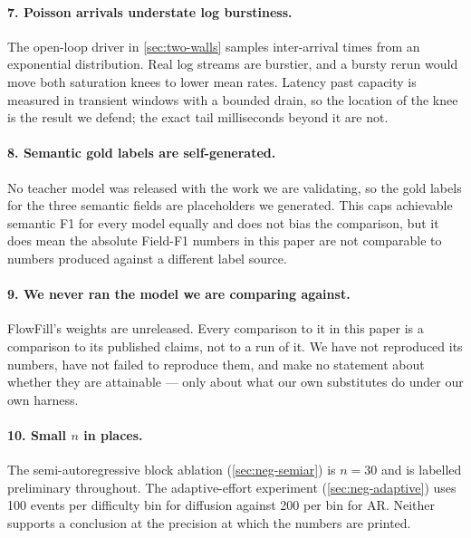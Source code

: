 \paragraph{7. Poisson arrivals understate log burstiness.} The open-loop driver
in \cref{sec:two-walls} samples inter-arrival times from an exponential
distribution. Real log streams are burstier, and a bursty rerun would move both
saturation knees to lower mean rates. Latency past capacity is measured in
transient windows with a bounded drain, so the location of the knee is the
result we defend; the exact tail milliseconds beyond it are not.

\paragraph{8. Semantic gold labels are self-generated.} No teacher model was
released with the work we are validating, so the gold labels for the three
semantic fields are placeholders we generated. This caps achievable semantic F1
for every model equally and does not bias the comparison, but it does mean the
absolute Field-F1 numbers in this paper are not comparable to numbers produced
against a different label source.

\paragraph{9. We never ran the model we are comparing against.} FlowFill's
weights are unreleased. Every comparison to it in this paper is a comparison to
its published claims, not to a run of it. We have not reproduced its numbers,
have not failed to reproduce them, and make no statement about whether they are
attainable --- only about what our own substitutes do under our own harness.

\paragraph{10. Small $n$ in places.} The semi-autoregressive block ablation
(\cref{sec:neg-semiar}) is $n=30$ and is labelled preliminary throughout. The
adaptive-effort experiment (\cref{sec:neg-adaptive}) uses 100 events per
difficulty bin for diffusion against 200 per bin for AR. Neither supports a
conclusion at the precision at which the numbers are printed.
